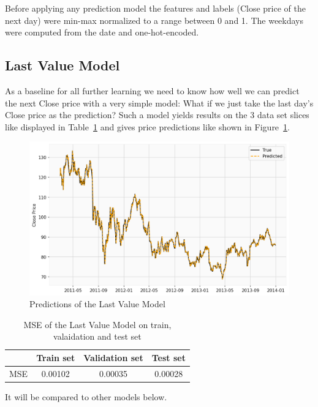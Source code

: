 \documentclass[utf8x]{ctexart}
\begin{document}
Before applying any prediction model the features and labels (Close price of the next day) were min-max normalized to a range between 0 and 1. The weekdays were computed from the date and one-hot-encoded.

\subsection{Last Value Model}

As a baseline for all further learning we need to know how well we can predict the next Close price with a very simple model: What if we just take the last day's Close price as the prediction?
Such a model yields results on the 3 data set slices like displayed in Table~\ref{tab:last_value_model} and gives price predictions like shown in Figure~\ref{fig:last_value_model}.

\begin{figure}[htb]
    \centering
    \includegraphics[width=\textwidth]{../images/last_value_model.png}
    \caption{Predictions of the Last Value Model}
    \label{fig:last_value_model}
\end{figure}

\begin{table}[ht]
    \centering
    \caption{MSE of the Last Value Model on train, valaidation and test set}
    \label{tab:last_value_model}
    \begin{tabular}{c|ccc}
            & Train set & Validation set & Test set \\
        \hline
        MSE & 0.00102   & 0.00035        & 0.00028  \\
    \end{tabular}
\end{table}

It will be compared to other models below.
\end{document}
